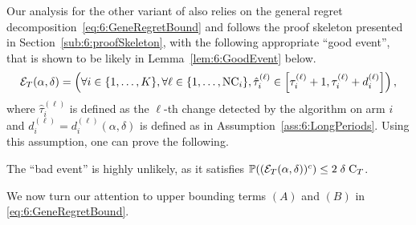 
Our analysis for the other variant of \GLRklUCB{} also relies on the general regret decomposition~\eqref{eq:6:GeneRegretBound} and follows the proof skeleton presented in Section~\ref{sub:6:proofSkeleton}, with the following appropriate ``good event'', that is shown to be likely in Lemma~\ref{lem:6:GoodEvent} below.
%
\begin{equation}\label{def:6:GoodEvenLocal}
    \mathcal{E}_T(\alpha,\delta) = \left(\forall i \in \{1, \ldots, K\}, \forall \ell \in \{1, \ldots, \text{NC}_i\}, \hat{\tau}^{(\ell)}_i \in \left[\tau_i^{(\ell)} + 1, \tau_i^{(\ell)} + d_i^{(\ell)}\right] \right),
\end{equation}
where $\widehat{\tau}_i^{(\ell)}$ is defined as the $\ell$-th change detected by the algorithm on arm $i$ and $d_i^{(\ell)}=d_i^{(\ell)}(\alpha,\delta)$ is defined as in Assumption~\ref{ass:6:LongPeriods}. Using this assumption, one can prove the following.

\begin{lemma}\label{lem:6:GoodEvent}
    The ``bad event'' is highly unlikely, as it satisfies $\mathbb{P}((\mathcal{E}_T(\alpha,\delta))^c) \leq 2 \; \delta \; \mathrm{C}_T$.
\end{lemma}


We now turn our attention to upper bounding terms $(A)$ and $(B)$ in \eqref{eq:6:GeneRegretBound}.

